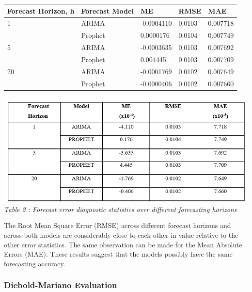 \documentclass[12pt,a4paper]{article}
\numberwithin{equation}{section}
\numberwithin{figure}{section}
\numberwithin{table}{section}
\let\origtable\table
\let\endorigtable\endtable
\renewenvironment{table}[1][2] {
    \expandafter\origtable\expandafter[H]
} {
    \endorigtable
}
\begin{document}
\begin{table}[H]
\centering
\begin{tabular}{lllll}
  \hline
Forecast Horizon, h & Forecast Model &  ME  & RMSE & MAE \\ 
  \hline
1 & ARIMA & -0.0004110 & 0.0103 & 0.007718 \\ 
    & Prophet & 0.0000176 & 0.0104 & 0.007749 \\ 
  5 & ARIMA & -0.0003635 & 0.0103 & 0.007692 \\ 
    & Prophet & 0.004445 & 0.0103 & 0.007709 \\ 
  20 & ARIMA & -0.0001769 & 0.0102 & 0.007649 \\ 
    & Prophet & -0.0000406 & 0.0102 & 0.007660 \\ 
   \hline
\end{tabular}
\caption{Forecast error diagnostic statistics over different forecasting horizons} 
\end{table}

\includegraphics[width=1.00000\textwidth]{error stats.png}\\
\emph{Table 2 : Forecast error diagnostic statistics over different
forecasting horizons}

The Root Mean Square Error (RMSE) across different forecast horizons and
across both models are considerably close to each other in value
relative to the other error statistics. The same observation can be made
for the Mean Absolute Errors (MAE). These results suggest that the
models possibly have the same forecasting accuracy.

\subsubsection{Diebold-Mariano
Evaluation}\label{diebold-mariano-evaluation-1}
\end{document}
